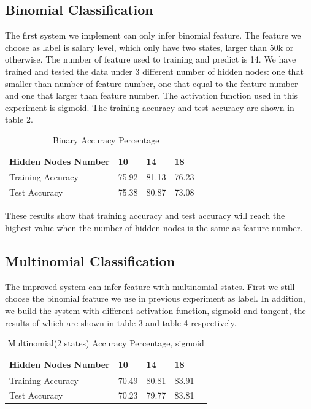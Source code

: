 \documentclass[11pt,letterpaper]{article}
\begin{document}
\subsection{Binomial Classification}
The first system we implement can only infer binomial feature. The feature we choose as label is salary level, which only have two states, larger than 50k or otherwise. The number of feature used to training and predict is 14. We have trained and tested the data under 3 different number of hidden nodes: one that smaller than number of feature number, one that equal to the feature number and one that larger than feature number.
The activation function used in this experiment is sigmoid. 
The training accuracy and test accuracy are shown in table 2. 


\begin{table}
\begin{center}
\begin{tabular}{|l|l|l|l|l|}
\hline \bf Hidden Nodes Number & \bf 10 & \bf 14 & \bf 18 \\ \hline
Training Accuracy& 75.92 & 81.13 & 76.23 \\
Test Accuracy & 75.38 & 80.87 & 73.08 \\

\hline
\end{tabular}
\end{center}
\caption{\label{binary} Binary Accuracy Percentage}
\end{table}

These results show that training accuracy and test accuracy will reach the highest value when the number of hidden nodes is the same as feature number.

\subsection{Multinomial Classification}
The improved system can infer feature with multinomial states. First we still choose the binomial feature we use in previous experiment as label. In addition, we build the system with different activation function, sigmoid and tangent, the results of which are shown in table 3 and table 4 respectively. 

\begin{table}
\begin{center}
\begin{tabular}{|l|l|l|l|l|}
\hline \bf Hidden Nodes Number & \bf 10 & \bf 14 & \bf 18 \\ \hline
Training Accuracy& 70.49 & 80.81 & 83.91 \\
Test Accuracy & 70.23 & 79.77 & 83.81 \\
\hline
\end{tabular}
\end{center}
\caption{\label{multi2-sig} Multinomial(2 states) Accuracy Percentage, sigmoid}
\end{table}
\end{document}
